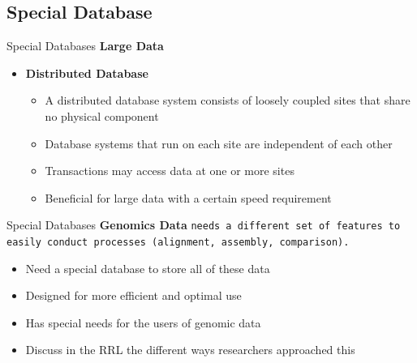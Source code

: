 \documentclass{beamer}
\begin{document}
    \subsection{Special Database}
    \begin{frame}{Special Databases}
        \textbf{Large Data}
        \begin{itemize}
            \item \textbf{Distributed Database}
            \begin{itemize}
                \item A distributed database system consists of loosely coupled sites that share no physical component             
                \item Database systems that run on each site are independent of each other
                \item Transactions may access data at one or more sites
                \cite[Ch.~19]{Silberschatz2010}
                \item Beneficial for large data with a certain speed requirement
            \end{itemize}
        \end{itemize}
    \end{frame}

    \begin{frame}{Special Databases}
        \textbf{Genomics Data}
        \texttt{needs a different set of features to easily conduct processes (alignment, assembly, comparison).}
        \begin{itemize}
            \item Need a special database to store all of these data
            \item Designed for more efficient and optimal use
            \item Has special needs for the users of genomic data
            \item Discuss in the RRL the different ways researchers approached this
        \end{itemize}
    \end{frame}
    
\end{document}
